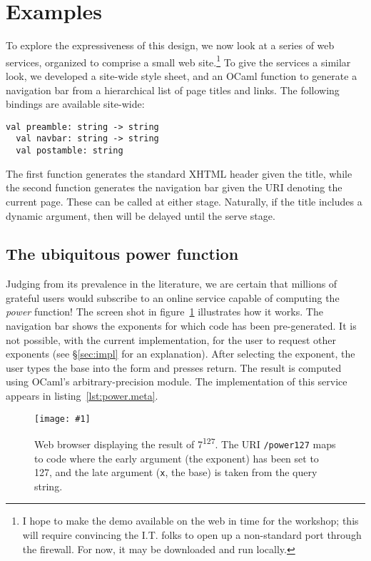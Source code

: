 \documentclass[preprint]{acm_proc_article-sp}
\newcommand{\myfig}[3]{%
  \begin{figure}[tbp]%
    #3%
    \caption{#2}%
    \label{fig:#1}%
  \end{figure}}
\newcommand{\screenshot}[2]{%
  \myfig{#1}{#2}
  {\centering%
    \texttt{[image: \#1]}}}
\begin{document}
\section{Examples}
\label{sec:eg}

To explore the expressiveness of this design, we now look at a
series of web services, organized to comprise a small web
site.\footnote{I hope to make the demo available on the web in time
  for the workshop; this will require convincing the I.T. folks to
  open up a non-standard port through the firewall.  For now, it may
  be downloaded and run locally.} %
To give the services a similar look, we developed a site-wide style
sheet, and an OCaml function to generate a navigation bar from a
hierarchical list of page titles and links.  The following bindings are
available site-wide:
\begin{lstlisting}[numbers=none]
  val preamble: string -> string
  val navbar: string -> string
  val postamble: string
\end{lstlisting}
The first function generates the standard XHTML header given the
title, while the second function generates the navigation bar given
the URI denoting the current page.  These can be called at either
stage.  Naturally, if the title includes a dynamic argument, then
 will be delayed until the serve stage.

\subsection{The ubiquitous power function}
\label{sec:eg:power}

Judging from its prevalence in the literature, we are certain that
millions of grateful users would subscribe to an online service
capable of computing the \emph{power} function!  The screen shot in
figure~\ref{fig:power127} illustrates how it works.  The navigation
bar shows the exponents for which code has been pre-generated.  It is
not possible, with the current implementation, for the user to request
other exponents (see \S\ref{sec:impl} for an explanation).  After
selecting the exponent, the user types the base into the form and
presses return.  The result is computed using OCaml's
arbitrary-precision  module.  The implementation of this
service appears in listing~\ref{lst:power.meta}.

\screenshot{power127}{Web browser displaying the result of
  7\textsuperscript{127}.  The URI \texttt{/power127} maps to code
  where the early argument (the exponent) has been set to 127, and the
  late argument (\texttt{x}, the base) is taken from the query
  string.}
\end{document}
